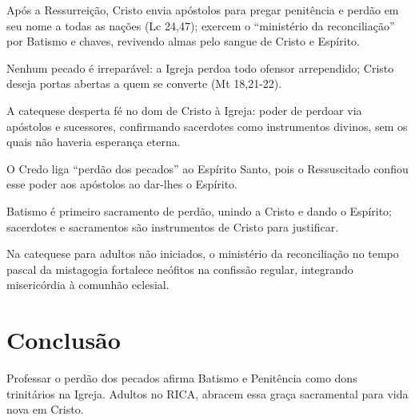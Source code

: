 Após a Ressurreição, Cristo envia apóstolos para pregar penitência e perdão em seu nome a todas as nações (Lc 24,47); exercem o ``ministério da reconciliação'' por Batismo e chaves, revivendo almas pelo sangue de Cristo e Espírito.

Nenhum pecado é irreparável: a Igreja perdoa todo ofensor arrependido; Cristo deseja portas abertas a quem se converte (Mt 18,21-22).

A catequese desperta fé no dom de Cristo à Igreja: poder de perdoar via apóstolos e sucessores, confirmando sacerdotes como instrumentos divinos, sem os quais não haveria esperança eterna.

O Credo liga ``perdão dos pecados'' ao Espírito Santo, pois o Ressuscitado confiou esse poder aos apóstolos ao dar-lhes o Espírito.

Batismo é primeiro sacramento de perdão, unindo a Cristo e dando o Espírito; sacerdotes e sacramentos são instrumentos de Cristo para justificar.

Na catequese para adultos não iniciados, o ministério da reconciliação no tempo pascal da mistagogia fortalece neófitos na confissão regular, integrando misericórdia à comunhão eclesial.

\section{Conclusão}

Professar o perdão dos pecados afirma Batismo e Penitência como dons trinitários na Igreja. Adultos no RICA, abracem essa graça sacramental para vida nova em Cristo.